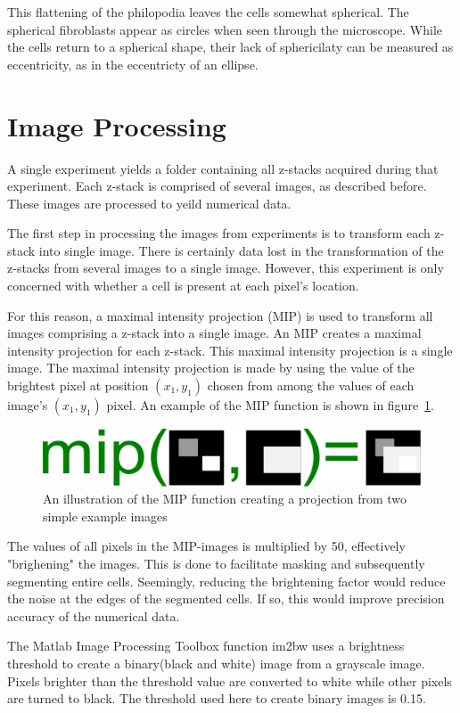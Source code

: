 \documentclass[twocolumn,notitlepage]{revtex4-1}
\begin{document}
This flattening of the philopodia leaves the cells somewhat spherical. The spherical fibroblasts appear as circles when seen through the microscope. While the cells return to a spherical shape, their lack of sphericilaty can be measured as eccentricity, as in the eccentricty of an ellipse.

\section*{Image Processing}
A single experiment yields a folder containing all z-stacks acquired during that experiment. Each z-stack is comprised of several images, as described before. These images are processed to yeild numerical data.

The first step in processing the images from experiments is to transform each z-stack into single image. There is certainly data lost in the transformation of the z-stacks from several images to a single image. However, this experiment is only concerned with whether a cell is present at each pixel's location.

For this reason, a maximal intensity projection (MIP) is used to transform all images comprising a z-stack into a single image. An MIP creates a maximal intensity projection for each z-stack. This maximal intensity projection is a single image. The maximal intensity projection is made by using the value of the brightest pixel at position $(x_1,y_1)$ chosen from among the values of each image's $(x_1,y_1)$ pixel. An example of the MIP function is shown in figure~\ref{fig:mip-illustration}.

\begin{figure}[!h]
\includegraphics[width=.4\textwidth]{./img/mip-illustration.pdf}
\caption{\label{fig:mip-illustration}An illustration of the MIP function creating a projection from two simple example images}
\end{figure}

The values of all pixels in the MIP-images is multiplied by 50, effectively "brighening" the images. This is done to facilitate masking and subsequently segmenting entire cells. Seemingly, reducing the brightening factor would reduce the noise at the edges of the segmented cells. If so, this would improve precision accuracy of the numerical data.

The Matlab Image Processing Toolbox function im2bw uses a brightness threshold to create a binary(black and white) image from a grayscale image. Pixels brighter than the threshold value are converted to white while other pixels are turned to black. The threshold used here to create binary images is 0.15.
\end{document}
